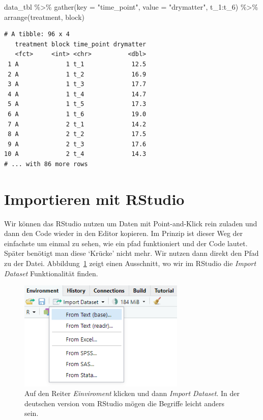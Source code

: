 \documentclass[
  letterpaper,
]{scrbook}
\newenvironment{Shaded}{\begin{snugshade}}{\end{snugshade}}
\newcommand{\AttributeTok}[1]{\textcolor[rgb]{0.40,0.45,0.13}{#1}}
\newcommand{\FunctionTok}[1]{\textcolor[rgb]{0.28,0.35,0.67}{#1}}
\newcommand{\NormalTok}[1]{\textcolor[rgb]{0.00,0.23,0.31}{#1}}
\newcommand{\SpecialCharTok}[1]{\textcolor[rgb]{0.37,0.37,0.37}{#1}}
\newcommand{\StringTok}[1]{\textcolor[rgb]{0.13,0.47,0.30}{#1}}
\begin{document}
\begin{Shaded}
\begin{Highlighting}[]
\NormalTok{data\_tbl }\SpecialCharTok{\%\textgreater{}\%} 
  \FunctionTok{gather}\NormalTok{(}\AttributeTok{key =} \StringTok{"time\_point"}\NormalTok{, }\AttributeTok{value =} \StringTok{"drymatter"}\NormalTok{, t\_1}\SpecialCharTok{:}\NormalTok{t\_6) }\SpecialCharTok{\%\textgreater{}\%} 
  \FunctionTok{arrange}\NormalTok{(treatment, block)}
\end{Highlighting}
\end{Shaded}

\begin{verbatim}
# A tibble: 96 x 4
   treatment block time_point drymatter
   <fct>     <int> <chr>          <dbl>
 1 A             1 t_1             12.5
 2 A             1 t_2             16.9
 3 A             1 t_3             17.7
 4 A             1 t_4             14.7
 5 A             1 t_5             17.3
 6 A             1 t_6             19.0
 7 A             2 t_1             14.2
 8 A             2 t_2             17.5
 9 A             2 t_3             17.6
10 A             2 t_4             14.3
# ... with 86 more rows
\end{verbatim}

\hypertarget{importieren-mit-rstudio}{%
\section{Importieren mit RStudio}\label{importieren-mit-rstudio}}

Wir können das RStudio nutzen um Daten mit Point-and-Klick rein zuladen
und dann den Code wieder in den Editor kopieren. Im Prinzip ist dieser
Weg der einfachste um einmal zu sehen, wie ein pfad funktioniert und der
Code lautet. Später benötigt man diese `Krücke' nicht mehr. Wir nutzen
dann direkt den Pfad zu der Datei. Abbildung~\ref{fig-imp-01} zeigt
einen Ausschnitt, wo wir im RStudio die \emph{Import Dataset}
Funktionalität finden.

\begin{figure}

{\centering \includegraphics[width=3.125in,height=\textheight]{./images/import_01.PNG}

}

\caption{\label{fig-imp-01}Auf den Reiter \emph{Einviroment} klicken und
dann \emph{Import Dataset}. In der deutschen version vom RStudio mögen
die Begriffe leicht anders sein.}

\end{figure}
\end{document}
